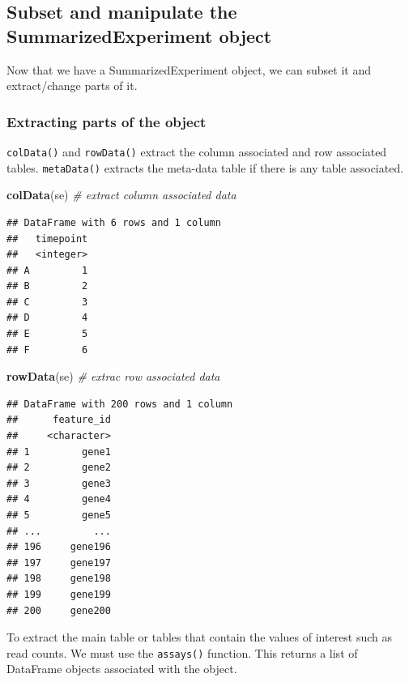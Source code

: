 \documentclass[12pt,]{krantz}
\newenvironment{Shaded}{\begin{snugshade}}{\end{snugshade}}
\newcommand{\CommentTok}[1]{\textcolor[rgb]{0.56,0.35,0.01}{\textit{#1}}}
\newcommand{\KeywordTok}[1]{\textcolor[rgb]{0.13,0.29,0.53}{\textbf{#1}}}
\newcommand{\NormalTok}[1]{#1}
\begin{document}
\hypertarget{subset-and-manipulate-the-summarizedexperiment-object}{%
\subsection{Subset and manipulate the SummarizedExperiment object}\label{subset-and-manipulate-the-summarizedexperiment-object}}

Now that we have a SummarizedExperiment object, we can subset it and extract/change
parts of it.

\hypertarget{extracting-parts-of-the-object}{%
\subsubsection{Extracting parts of the object}\label{extracting-parts-of-the-object}}

\texttt{colData()} and \texttt{rowData()} extract the column associated and row associated
tables. \texttt{metaData()} extracts the meta-data table if there is any table associated.

\begin{Shaded}
\begin{Highlighting}[]
\KeywordTok{colData}\NormalTok{(se) }\CommentTok{# extract column associated data}
\end{Highlighting}
\end{Shaded}

\begin{verbatim}
## DataFrame with 6 rows and 1 column
##   timepoint
##   <integer>
## A         1
## B         2
## C         3
## D         4
## E         5
## F         6
\end{verbatim}

\begin{Shaded}
\begin{Highlighting}[]
\KeywordTok{rowData}\NormalTok{(se) }\CommentTok{# extrac row associated data}
\end{Highlighting}
\end{Shaded}

\begin{verbatim}
## DataFrame with 200 rows and 1 column
##      feature_id
##     <character>
## 1         gene1
## 2         gene2
## 3         gene3
## 4         gene4
## 5         gene5
## ...         ...
## 196     gene196
## 197     gene197
## 198     gene198
## 199     gene199
## 200     gene200
\end{verbatim}

To extract the main table or tables that contain the values of interest such
as read counts. We must use the \texttt{assays()} function. This returns a list of
DataFrame objects associated with the object.
\end{document}
